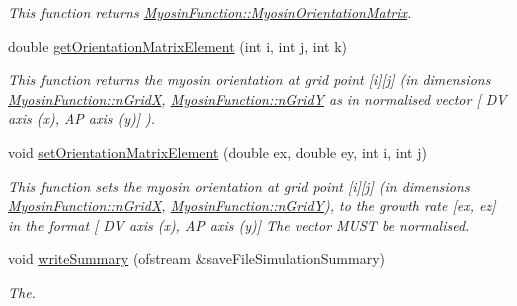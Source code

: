 \begin{DoxyCompactItemize}
\begin{DoxyCompactList}\small\item\em This function returns \hyperlink{classMyosinFunction_a171909633b0117031045287fdbc401db}{Myosin\+Function\+::\+Myosin\+Orientation\+Matrix}. \end{DoxyCompactList}\item 
\hypertarget{classMyosinFunction_a5952daaeebe5fe284ecf096687d1c7c0}{}double \hyperlink{classMyosinFunction_a5952daaeebe5fe284ecf096687d1c7c0}{get\+Orientation\+Matrix\+Element} (int i, int j, int k)\label{classMyosinFunction_a5952daaeebe5fe284ecf096687d1c7c0}

\begin{DoxyCompactList}\small\item\em This function returns the myosin orientation at grid point \mbox{[}i\mbox{]}\mbox{[}j\mbox{]} (in dimensions \hyperlink{classMyosinFunction_a36ac0b5ce87011878a7f1954e270e5ae}{Myosin\+Function\+::n\+Grid\+X}, \hyperlink{classMyosinFunction_a1652a8a0d154b136434bee037e0262a4}{Myosin\+Function\+::n\+Grid\+Y} as in normalised vector \mbox{[} D\+V axis (x), A\+P axis (y)\mbox{]} ). \end{DoxyCompactList}\item 
\hypertarget{classMyosinFunction_a7f9b40f267049352619709243c929a25}{}void \hyperlink{classMyosinFunction_a7f9b40f267049352619709243c929a25}{set\+Orientation\+Matrix\+Element} (double ex, double ey, int i, int j)\label{classMyosinFunction_a7f9b40f267049352619709243c929a25}

\begin{DoxyCompactList}\small\item\em This function sets the myosin orientation at grid point \mbox{[}i\mbox{]}\mbox{[}j\mbox{]} (in dimensions \hyperlink{classMyosinFunction_a36ac0b5ce87011878a7f1954e270e5ae}{Myosin\+Function\+::n\+Grid\+X}, \hyperlink{classMyosinFunction_a1652a8a0d154b136434bee037e0262a4}{Myosin\+Function\+::n\+Grid\+Y}), to the growth rate \mbox{[}ex, ez\mbox{]} in the format \mbox{[} D\+V axis (x), A\+P axis (y)\mbox{]} The vector M\+U\+S\+T be normalised. \end{DoxyCompactList}\item 
void \hyperlink{classMyosinFunction_ad0bfc8aafe7e54a46f04e8eeb84ce457}{write\+Summary} (ofstream \&save\+File\+Simulation\+Summary)
\begin{DoxyCompactList}\small\item\em The. \end{DoxyCompactList}\end{DoxyCompactItemize}
